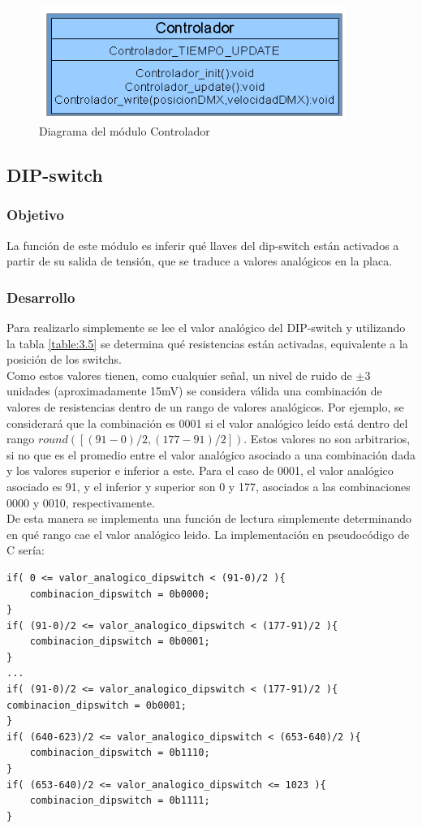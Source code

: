 \begin{figure}[!ht]
	\centering
	\includegraphics[width=10cm,scale=1]{resources/3_27-moduloControlador.png}
	\caption{Diagrama del módulo Controlador}
	\label{fig:\thefigure}
\end{figure}

\subsection{DIP-switch}
\subsubsection{Objetivo}
La función de este módulo es inferir qué llaves del dip-switch están activados a partir de su salida de tensión, que se traduce a valores analógicos en la placa. 

\subsubsection{Desarrollo}
Para realizarlo simplemente se lee el valor analógico del DIP-switch y utilizando la tabla \ref{table:3.5} se determina qué resistencias están activadas, equivalente a la posición de los switchs. \\
Como estos valores tienen, como cualquier señal, un nivel de ruido de \(\pm\)3 unidades (aproximadamente 15mV) se considera válida una combinación de valores de resistencias dentro de un rango de valores analógicos. Por ejemplo, se considerará que la combinación es 0001 si el valor analógico leído está dentro del rango \(round([(91-0)/2,(177-91)/2])\). Estos valores no son arbitrarios, si no que es el promedio entre el valor analógico asociado a una combinación dada y los valores superior e inferior a este. Para el caso de 0001, el valor analógico asociado es 91, y el inferior y superior son 0 y 177, asociados a las combinaciones 0000 y 0010, respectivamente.\\
De esta manera se implementa una función de lectura simplemente determinando en qué rango cae el valor analógico leido. La implementación en pseudocódigo de C sería:
\begin{lstlisting}[style=CStyle]
if( 0 <= valor_analogico_dipswitch < (91-0)/2 ){
	combinacion_dipswitch = 0b0000;
}
if( (91-0)/2 <= valor_analogico_dipswitch < (177-91)/2 ){
	combinacion_dipswitch = 0b0001;
}
...
if( (91-0)/2 <= valor_analogico_dipswitch < (177-91)/2 ){
combinacion_dipswitch = 0b0001;
}
if( (640-623)/2 <= valor_analogico_dipswitch < (653-640)/2 ){
	combinacion_dipswitch = 0b1110;
}
if( (653-640)/2 <= valor_analogico_dipswitch <= 1023 ){
	combinacion_dipswitch = 0b1111;
}
\end{lstlisting}

